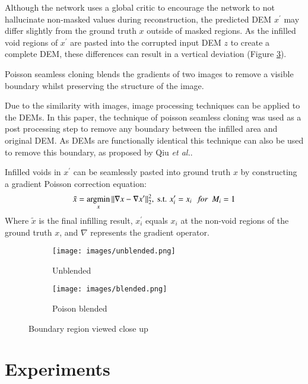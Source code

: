 \documentclass[twocolumn]{article}
\begin{document}
Although the network uses a global critic to encourage the network to not hallucinate non-masked values during reconstruction, the predicted DEM \(x^\prime\) may differ slightly from the ground truth \(x\) outside of masked regions.
As the infilled void regions of \(x^\prime\) are pasted into the corrupted input DEM \(z\) to create a complete DEM, these differences can result in a vertical deviation (Figure \ref{fig:poisson}).

Poisson seamless cloning\autocite{perezPoissonImageEditing2003} blends the gradients of two images to remove a visible boundary whilst preserving the structure of the image.

Due to the similarity with images, image processing techniques can be applied to the DEMs.
In this paper, the technique of poisson seamless cloning\autocite{perezPoissonImageEditing2003} was used as a post processing step to remove any boundary between the infilled area and original DEM.
As DEMs are functionally identical this technique can also be used to remove this boundary, as proposed by Qiu \emph{et al.}\autocite{qiuVoidFillingDigital2019}.

Infilled voids in \(x^\prime\) can be seamlessly pasted into ground truth \(x\) by constructing a gradient Poisson correction equation:
\begin{equation}
\tilde{x} = \operatorname*{argmin}_x \Vert \nabla x - \nabla x^\prime \Vert^2_2, \text{ s.t. } x^\prime_i = x_i  \text{ \space \space \it{for} \space } M_i = 1
\end{equation}
Where \(\tilde{x}\) is the final infilling result, \(x^\prime_i\) equals \(x_i\) at the non-void regions of the ground truth \(x\), and \(\nabla\) represents the gradient operator.

\begin{figure}
\centering
\begin{subfigure}{0.4\textwidth}
    \caption{Unblended}
    \texttt{[image: images/unblended.png]}
    \label{fig:unblended}
\end{subfigure}
\hfill
\begin{subfigure}{0.4\textwidth}
    \caption{Poison blended}
    \texttt{[image: images/blended.png]}
    \label{fig:blended}
\end{subfigure}
\caption{\label{fig:poisson}Boundary region viewed close up}
\end{figure}


\section{Experiments}
\label{sec:orgbeee2ff}
\end{document}
